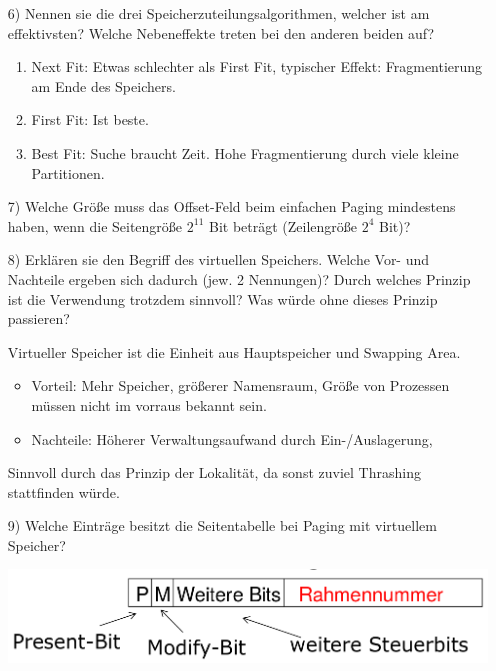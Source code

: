 \documentclass[11pt,a4paper]{article}
\begin{document}
\begin{itemize}
\begin{enumerate}
\end{enumerate}

\item[6)] Nennen sie die drei Speicherzuteilungsalgorithmen, welcher ist am effektivsten? Welche Nebeneffekte treten bei den anderen beiden auf?

\begin{enumerate}
\item Next Fit: Etwas schlechter als First Fit, typischer Effekt: Fragmentierung am Ende des Speichers.
\item First Fit: Ist beste.
\item Best Fit: Suche braucht Zeit. Hohe Fragmentierung durch viele kleine Partitionen.
\end{enumerate}

\item[7)] Welche Größe muss das Offset-Feld beim einfachen Paging mindestens haben, wenn die Seitengröße $2^{11}$ Bit beträgt (Zeilengröße $2^4$ Bit)?



\item[8)] Erklären sie den Begriff des virtuellen Speichers. Welche Vor- und Nachteile ergeben sich dadurch (jew. 2 Nennungen)? Durch welches Prinzip ist die Verwendung trotzdem sinnvoll? Was würde ohne dieses Prinzip passieren?

Virtueller Speicher ist die Einheit aus Hauptspeicher und Swapping Area.

\begin{itemize}
\item Vorteil: Mehr Speicher, größerer Namensraum, Größe von Prozessen müssen nicht im vorraus bekannt sein.
\item Nachteile: Höherer Verwaltungsaufwand durch Ein-/Auslagerung,  
\end{itemize}

Sinnvoll durch das Prinzip der Lokalität, da sonst zuviel Thrashing stattfinden würde.
 

\pagebreak
 
 
\item[9)] Welche Einträge besitzt die Seitentabelle bei Paging mit virtuellem Speicher?

\includegraphics[scale=0.5]{seitentabelle.png}


\end{itemize}
\end{document}
